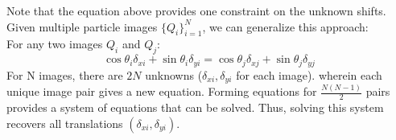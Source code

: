 \documentclass{article}
\begin{document}
\begin{enumerate}
Note that the equation above provides one constraint on the unknown shifts. Given multiple particle images $\{Q_i\}_{i=1}^{N}$, we can generalize this approach:\\
For any two images $Q_i$ and $Q_j$:
\begin{equation}
    \cos\theta_i \delta_{xi} + \sin\theta_i \delta_{yi} = \cos\theta_j \delta_{xj} + \sin\theta_j \delta_{yj}
\end{equation}
For N images, there are $2N$ unknowns ($\delta_{xi}, \delta_{yi}$ for each image). wherein each unique image pair gives a new equation. Forming equations for $\frac{N(N-1)}{2}$ pairs provides a system of equations that can be solved.
Thus, solving this system recovers all translations $(\delta_{xi}, \delta_{yi})$.

\end{enumerate}
\end{document}
